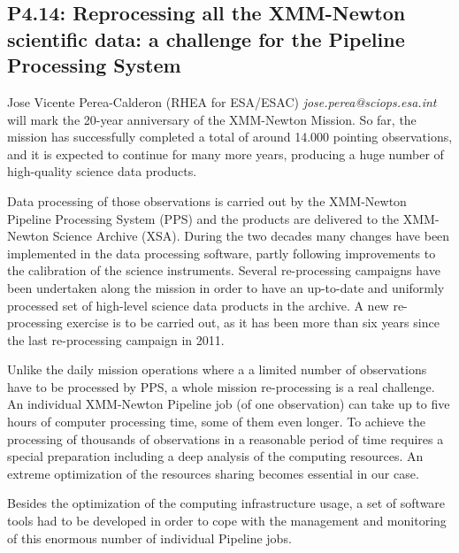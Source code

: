 \documentclass{report}
\begin{document}
\subsection*{P4.14: Reprocessing all the XMM-Newton scientific data: a challenge for the Pipeline Processing System}
\bigskip
Jose Vicente Perea-Calderon (RHEA for ESA/ESAC) \newline   \newline   \newline   \newline  \newline  \newline\newline
{\it jose.perea@sciops.esa.int}\newline
\newline{} will mark the 20-year anniversary of the XMM-Newton Mission. 
So far, the mission has successfully completed a total of around 14.000 pointing observations, and it is expected to continue for many more years, producing a huge number of high-quality science data products. 

Data processing of those observations is carried out by the XMM-Newton Pipeline Processing System (PPS) and the products are delivered to the XMM-Newton Science Archive (XSA). During the two decades many changes have been implemented in the data processing software, partly following improvements to the calibration of the science instruments. Several re-processing campaigns have been undertaken along the mission in order to have an up-to-date and uniformly processed set of high-level science data products in the archive. A new re-processing exercise is to be carried out, as it has been more than six years since the last re-processing campaign in 2011.

Unlike the daily mission operations where a a limited number of observations have to be processed by PPS, a whole mission re-processing is a real challenge. An individual XMM-Newton Pipeline job (of one observation) can take up to five hours of computer processing time, some of them even longer. To achieve the processing of thousands of observations in a reasonable period of time requires a special preparation including a deep analysis of the computing resources. An extreme optimization of the resources sharing becomes essential in our case.

Besides the optimization of the computing infrastructure usage, a set of software tools had to be developed in order
to cope with the management and monitoring of this enormous number of individual Pipeline jobs.\newline
\newpage
\end{document}
